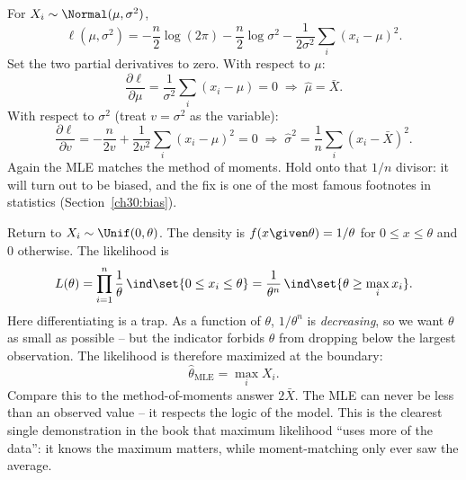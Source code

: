 \begin{example}
\label{ch30:ex-mle-normal}
For $X_i\sim\Normal(\mu,\sigma^2)$,
\[
  \ell(\mu,\sigma^2)
  = -\frac{n}{2}\log(2\pi) - \frac{n}{2}\log\sigma^2
    - \frac{1}{2\sigma^2}\sum_i (x_i-\mu)^2.
\]
Set the two partial derivatives to zero. With respect to $\mu$:
\[
  \frac{\partial\ell}{\partial\mu}
  = \frac{1}{\sigma^2}\sum_i (x_i-\mu) = 0
  \;\Longrightarrow\;
  \hat\mu = \bar X.
\]
With respect to $\sigma^2$ (treat $v=\sigma^2$ as the variable):
\[
  \frac{\partial\ell}{\partial v}
  = -\frac{n}{2v} + \frac{1}{2v^2}\sum_i (x_i-\mu)^2 = 0
  \;\Longrightarrow\;
  \hat\sigma^2 = \frac1n\sum_i (x_i-\bar X)^2.
\]
Again the MLE matches the method of moments. Hold onto that $1/n$ divisor: it
will turn out to be biased, and the fix is one of the most famous footnotes in
statistics (Section~\ref{ch30:bias}).
\end{example}

\begin{example}
\label{ch30:ex-mle-unif}
Return to $X_i\sim\Unif(0,\theta)$. The density is $f(x\given\theta)=1/\theta$
for $0\le x\le\theta$ and $0$ otherwise. The likelihood is
\[
  L(\theta) = \prod_{i=1}^n \frac{1}{\theta}\,\ind\set{0\le x_i\le\theta}
            = \frac{1}{\theta^n}\,\ind\set{\theta \ge \max_i x_i}.
\]
Here differentiating is a trap. As a function of $\theta$, $1/\theta^n$ is
\emph{decreasing}, so we want $\theta$ as small as possible -- but the indicator
forbids $\theta$ from dropping below the largest observation. The likelihood is
therefore maximized at the boundary:
\[
  \boxed{\;\hat\theta_{\mathrm{MLE}} = \max_i X_i.\;}
\]
Compare this to the method-of-moments answer $2\bar X$. The MLE can never be
less than an observed value -- it respects the logic of the model. This is the
clearest single demonstration in the book that maximum likelihood ``uses more
of the data'': it knows the maximum matters, while moment-matching only ever saw
the average.
\end{example}

